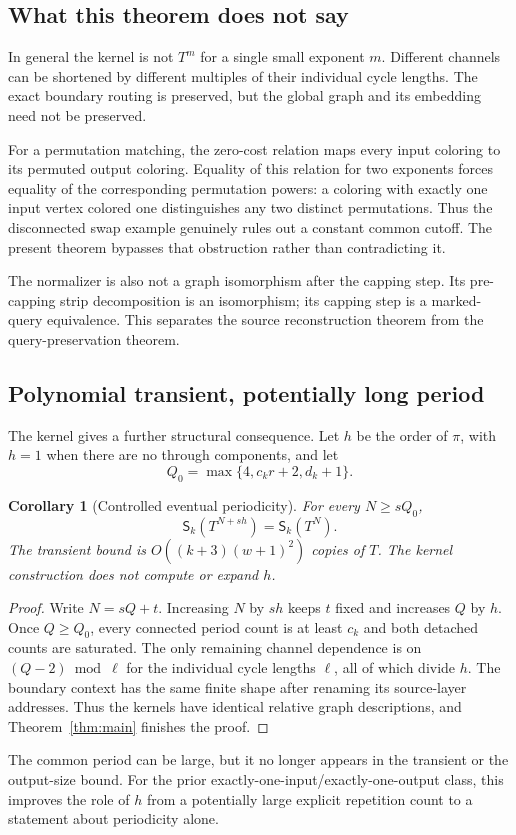 \documentclass[11pt]{article}
\newtheorem{corollary}[theorem]{Corollary}
\theoremstyle{remark}\newtheorem{remark}[theorem]{Remark}
\newcommand{\Sig}{\mathsf S}
\begin{document}
\subsection{What this theorem does not say}
In general the kernel is not $T^m$ for a single small exponent $m$. Different channels can be shortened by different multiples of their individual cycle lengths. The exact boundary routing is preserved, but the global graph and its embedding need not be preserved.

For a permutation matching, the zero-cost relation maps every input coloring to its permuted output coloring. Equality of this relation for two exponents forces equality of the corresponding permutation powers: a coloring with exactly one input vertex colored one distinguishes any two distinct permutations. Thus the disconnected swap example genuinely rules out a constant common cutoff. The present theorem bypasses that obstruction rather than contradicting it.

The normalizer is also not a graph isomorphism after the capping step. Its pre-capping strip decomposition is an isomorphism; its capping step is a marked-query equivalence. This separates the source reconstruction theorem from the query-preservation theorem.

\subsection{Polynomial transient, potentially long period}
The kernel gives a further structural consequence. Let $h$ be the order of $\pi$, with $h=1$ when there are no through components, and let
\[
 Q_0=\max\{4,c_k r+2,d_k+1\}.
\]
\begin{corollary}[Controlled eventual periodicity]\label{cor:periodic}
For every $N\ge sQ_0$,
\[
 \Sig_k(T^{N+sh})=\Sig_k(T^N).
\]
The transient bound is $O((k+3)(w+1)^2)$ copies of $T$. The kernel construction does not compute or expand $h$.
\end{corollary}
\begin{proof}
Write $N=sQ+t$. Increasing $N$ by $sh$ keeps $t$ fixed and increases $Q$ by $h$. Once $Q\ge Q_0$, every connected period count is at least $c_k$ and both detached counts are saturated. The only remaining channel dependence is on $(Q-2)\bmod\ell$ for the individual cycle lengths $\ell$, all of which divide $h$. The boundary context has the same finite shape after renaming its source-layer addresses. Thus the kernels have identical relative graph descriptions, and Theorem~\ref{thm:main} finishes the proof.
\end{proof}
The common period can be large, but it no longer appears in the transient or the output-size bound. For the prior exactly-one-input/exactly-one-output class, this improves the role of $h$ from a potentially large explicit repetition count to a statement about periodicity alone.
\end{document}
